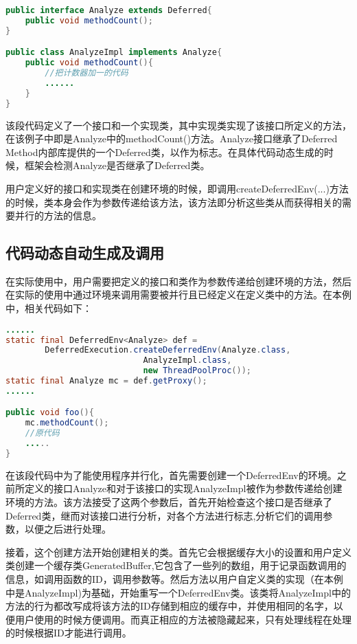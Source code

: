 \begin{lstlisting}[language=Java]
public interface Analyze extends Deferred{
	public void methodCount();
}

public class AnalyzeImpl implements Analyze{
	public void methodCount(){
		//把计数器加一的代码
		......
	}
}
\end{lstlisting}

该段代码定义了一个接口和一个实现类，其中实现类实现了该接口所定义的方法，在该例子中即是Analyze中的methodCount()方法。Analyze接口继承了Deferred Method内部库提供的一个Deferred类，以作为标志。在具体代码动态生成的时候，框架会检测Analyze是否继承了Deferred类。

用户定义好的接口和实现类在创建环境的时候，即调用createDeferredEnv(...)方法的时候，类本身会作为参数传递给该方法，该方法即分析这些类从而获得相关的需要并行的方法的信息。

\subsection{代码动态自动生成及调用}

在实际使用中，用户需要把定义的接口和类作为参数传递给创建环境的方法，然后在实际的使用中通过环境来调用需要被并行且已经定义在定义类中的方法。在本例中，相关代码如下：

\begin{lstlisting}[language=Java]
......
static final DeferredEnv<Analyze> def = 
		DeferredExecution.createDeferredEnv(Analyze.class, 
							AnalyzeImpl.class, 
							new ThreadPoolProc());
static final Analyze mc = def.getProxy();
......

public void foo(){
	mc.methodCount();
	//原代码
	.....
}
\end{lstlisting}

在该段代码中为了能使用程序并行化，首先需要创建一个DeferredEnv的环境。之前所定义的接口Analyze和对于该接口的实现AnalyzeImpl被作为参数传递给创建环境的方法。该方法接受了这两个参数后，首先开始检查这个接口是否继承了Deferred类，继而对该接口进行分析，对各个方法进行标志,分析它们的调用参数，以便之后进行处理。

接着，这个创建方法开始创建相关的类。首先它会根据缓存大小的设置和用户定义类创建一个缓存类GeneratedBuffer,它包含了一些列的数组，用于记录函数调用的信息，如调用函数的ID，调用参数等。然后方法以用户自定义类的实现（在本例中是AnalyzeImpl)为基础，开始重写一个DeferredEnv类。该类将AnalyzeImpl中的方法的行为都改写成将该方法的ID存储到相应的缓存中，并使用相同的名字，以便用户使用的时候方便调用。而真正相应的方法被隐藏起来，只有处理线程在处理的时候根据ID才能进行调用。

